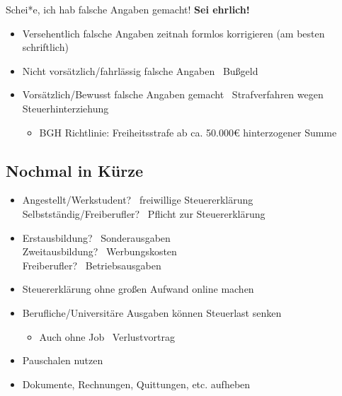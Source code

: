 \documentclass{beamer}
\begin{document}
			\begin{frame}{Schei*e, ich hab falsche Angaben gemacht!}
				\textbf{Sei ehrlich!}\n
				\begin{itemize}
					\item Versehentlich falsche Angaben zeitnah formlos korrigieren (am besten schriftlich)
					\item Nicht vorsätzlich/fahrlässig falsche Angaben \textrightarrow\ Bußgeld
					\item Vorsätzlich/Bewusst falsche Angaben gemacht \textrightarrow\ Strafverfahren wegen Steuerhinterziehung
					\begin{itemize}
						\item BGH Richtlinie: Freiheitsstrafe ab ca. 50.000€ hinterzogener Summe
					\end{itemize}
				\end{itemize}
			\end{frame}
		
		\subsection{Nochmal in Kürze}
		
			\begin{frame}
				\begin{itemize}
					\item Angestellt/Werkstudent? \textrightarrow\ freiwillige Steuererklärung\\
					Selbstständig/Freiberufler? \textrightarrow\ Pflicht zur Steuererklärung
					\item Erstausbildung? \textrightarrow\ Sonderausgaben\\
					Zweitausbildung? \textrightarrow\ Werbungskosten\\
					Freiberufler? \textrightarrow\ Betriebsausgaben\pause
					\item Steuererklärung ohne großen Aufwand online machen\pause
					\item Berufliche/Universitäre Ausgaben können Steuerlast senken
					\begin{itemize}
						\item Auch ohne Job \textrightarrow\ Verlustvortrag
					\end{itemize}
					\item Pauschalen nutzen
					\item Dokumente, Rechnungen, Quittungen, etc. aufheben
				\end{itemize}
			\end{frame}
		
\end{document}
